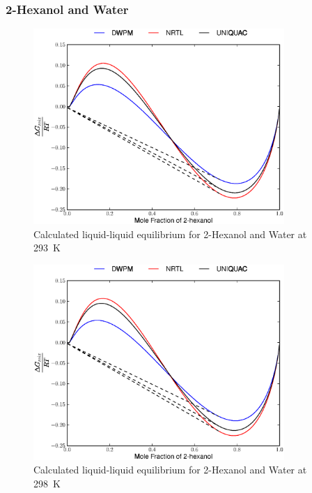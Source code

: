 \subsubsection*{2-Hexanol and Water}

\begin{figure}[hp]
\centering
\includegraphics[width = 0.85\textwidth]{Results_Parts/BinaryParams/2-hexanol-water/AllModelsGibbsPlots/T_293.eps}
\caption{Calculated liquid-liquid equilibrium for 2-Hexanol and Water at 293~$\mathrm{K}$} 
\end{figure}

\begin{figure}[hp]
\centering
\includegraphics[width = 0.85\textwidth]{Results_Parts/BinaryParams/2-hexanol-water/AllModelsGibbsPlots/T_298.eps}
\caption{Calculated liquid-liquid equilibrium for 2-Hexanol and Water at 298~$\mathrm{K}$}
\end{figure}

